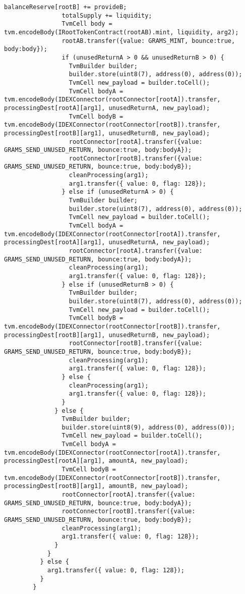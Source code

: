 \begin{lstlisting}[firstnumber=248]
                balanceReserve[rootB] += provideB;
                totalSupply += liquidity;
                TvmCell body = tvm.encodeBody(IRootTokenContract(rootAB).mint, liquidity, arg2);
                rootAB.transfer({value: GRAMS_MINT, bounce:true, body:body});
                if (unusedReturnA > 0 && unusedReturnB > 0) {
                  TvmBuilder builder;
                  builder.store(uint8(7), address(0), address(0));
                  TvmCell new_payload = builder.toCell();
                  TvmCell bodyA = tvm.encodeBody(IDEXConnector(rootConnector[rootA]).transfer, processingDest[rootA][arg1], unusedReturnA, new_payload);
                  TvmCell bodyB = tvm.encodeBody(IDEXConnector(rootConnector[rootB]).transfer, processingDest[rootB][arg1], unusedReturnB, new_payload);
                  rootConnector[rootA].transfer({value: GRAMS_SEND_UNUSED_RETURN, bounce:true, body:bodyA});
                  rootConnector[rootB].transfer({value: GRAMS_SEND_UNUSED_RETURN, bounce:true, body:bodyB});
                  cleanProcessing(arg1);
                  arg1.transfer({ value: 0, flag: 128});
                } else if (unusedReturnA > 0) {
                  TvmBuilder builder;
                  builder.store(uint8(7), address(0), address(0));
                  TvmCell new_payload = builder.toCell();
                  TvmCell bodyA = tvm.encodeBody(IDEXConnector(rootConnector[rootA]).transfer, processingDest[rootA][arg1], unusedReturnA, new_payload);
                  rootConnector[rootA].transfer({value: GRAMS_SEND_UNUSED_RETURN, bounce:true, body:bodyA});
                  cleanProcessing(arg1);
                  arg1.transfer({ value: 0, flag: 128});
                } else if (unusedReturnB > 0) {
                  TvmBuilder builder;
                  builder.store(uint8(7), address(0), address(0));
                  TvmCell new_payload = builder.toCell();
                  TvmCell bodyB = tvm.encodeBody(IDEXConnector(rootConnector[rootB]).transfer, processingDest[rootB][arg1], unusedReturnB, new_payload);
                  rootConnector[rootB].transfer({value: GRAMS_SEND_UNUSED_RETURN, bounce:true, body:bodyB});
                  cleanProcessing(arg1);
                  arg1.transfer({ value: 0, flag: 128});
                } else {
                  cleanProcessing(arg1);
                  arg1.transfer({ value: 0, flag: 128});
                }
              } else {
                TvmBuilder builder;
                builder.store(uint8(9), address(0), address(0));
                TvmCell new_payload = builder.toCell();
                TvmCell bodyA = tvm.encodeBody(IDEXConnector(rootConnector[rootA]).transfer, processingDest[rootA][arg1], amountA, new_payload);
                TvmCell bodyB = tvm.encodeBody(IDEXConnector(rootConnector[rootB]).transfer, processingDest[rootB][arg1], amountB, new_payload);
                rootConnector[rootA].transfer({value: GRAMS_SEND_UNUSED_RETURN, bounce:true, body:bodyA});
                rootConnector[rootB].transfer({value: GRAMS_SEND_UNUSED_RETURN, bounce:true, body:bodyB});
                cleanProcessing(arg1);
                arg1.transfer({ value: 0, flag: 128});
              }
            }
          } else {
            arg1.transfer({ value: 0, flag: 128});
          }
        }


\end{lstlisting}
